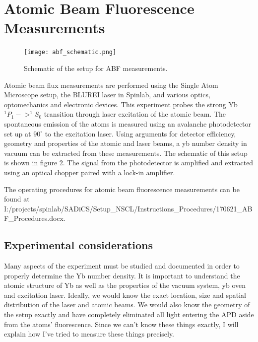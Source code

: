 \documentclass[12pt, a4paper]{article}
\begin{document}
\section{Atomic Beam Fluorescence Measurements}
\begin{figure}
  \texttt{[image: abf\_schematic.png]}
  \vspace*{-3mm}
  \caption{Schematic of the setup for ABF measurements.}
\end{figure}
Atomic beam flux measurements are performed using the Single Atom Microscope setup, the BLUREI laser in Spinlab, and various optics, optomechanics and electronic devices. This experiment probes the strong Yb $^{1}P_{1} -> ^{1}S_{0}$ transition through laser excitation of the atomic beam. The spontaneous emission of the atoms is measured using an avalanche photodetector set up at $90^{\circ}$ to the excitation laser. Using arguments for detector efficiency, geometry and properties of the atomic and laser beams, a yb number density in vacuum can be extracted from these measurements. The schematic of this setup is shown in figure 2. The signal from the photodetector is amplified and extracted using an optical chopper paired with a lock-in amplifier.

The operating procedures for atomic beam fluorescence measurements can be found at I:/projects/spinlab/SADiCS/Setup\_NSCL/Instructions\_Procedures/170621\_ABF\_Procedures.docx.
 
\subsection{Experimental considerations}
Many aspects of the experiment must be studied and documented in order to properly determine the Yb number density. It is important to understand the atomic structure of Yb as well as the properties of the vacuum system, yb oven and excitation laser. Ideally, we would know the exact location, size and spatial distribution of the laser and atomic beams. We would also know the geometry of the setup exactly and have completely eliminated all light entering the APD aside from the atoms' fluorescence. Since we can't know these things exactly, I will explain how I've tried to measure these things precisely. 
\end{document}
